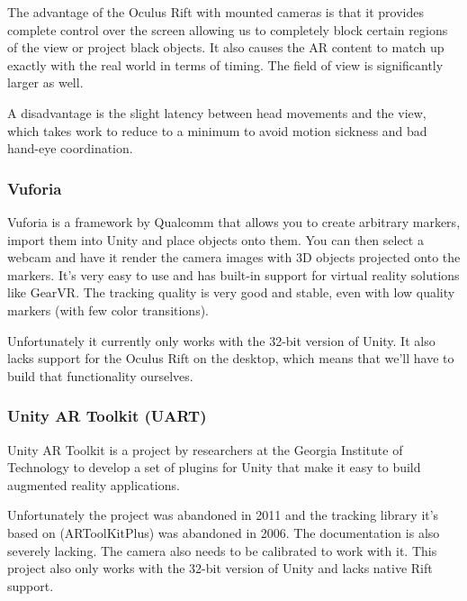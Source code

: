 			The advantage of the Oculus Rift with mounted cameras is that it
			provides complete control over the screen allowing us to completely
			block certain regions of the view or project black objects. It also
			causes the AR content to match up exactly with the real world in
			terms of timing. The field of view is significantly larger as well.
			
			A disadvantage is the slight latency between head movements and the
			view, which takes work to reduce to a minimum to avoid motion
			sickness and bad hand-eye coordination.

			\subsubsection{Vuforia} \label{sssec:vuforia}
				Vuforia is a framework by Qualcomm that allows you to create
				arbitrary markers, import them into Unity and place objects onto
				them. \cite{vuforia} You can then select a webcam and have it
				render the camera images with 3D objects projected onto the
				markers. It's very easy to use and has built-in support for
				virtual reality solutions like GearVR. The tracking quality is
				very good and stable, even with low quality markers (with few
				color transitions).

				Unfortunately it currently only works with the 32-bit version of
				Unity. It also lacks support for the Oculus Rift on the desktop,
				which means that we'll have to build that functionality
				ourselves.

			\subsubsection{Unity AR Toolkit (UART)} \label{sssec:uart}
				Unity AR Toolkit \cite{uart} is a project by researchers at the
				Georgia Institute of Technology to develop a set of plugins for
				Unity that make it easy to build augmented reality applications.

				Unfortunately the project was abandoned in 2011 and the tracking
				library it's based on (ARToolKitPlus) was abandoned in 2006. The
				documentation is also severely lacking. The camera also needs to
				be calibrated to work with it. This project also only works with
				the 32-bit version of Unity and lacks native Rift support.

